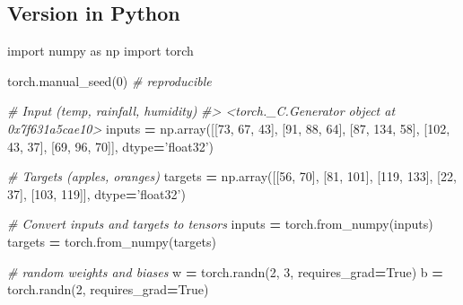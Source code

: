 \documentclass[]{book}
\newenvironment{Shaded}{\begin{snugshade}}{\end{snugshade}}
\newcommand{\CommentTok}[1]{\textcolor[rgb]{0.56,0.35,0.01}{\textit{#1}}}
\newcommand{\DecValTok}[1]{\textcolor[rgb]{0.00,0.00,0.81}{#1}}
\newcommand{\ImportTok}[1]{#1}
\newcommand{\NormalTok}[1]{#1}
\newcommand{\OperatorTok}[1]{\textcolor[rgb]{0.81,0.36,0.00}{\textbf{#1}}}
\newcommand{\StringTok}[1]{\textcolor[rgb]{0.31,0.60,0.02}{#1}}
\newcommand{\VariableTok}[1]{\textcolor[rgb]{0.00,0.00,0.00}{#1}}
\begin{document}
\hypertarget{version-in-python}{%
\subsection{Version in Python}\label{version-in-python}}

\begin{Shaded}
\begin{Highlighting}[]
\ImportTok{import}\NormalTok{ numpy }\ImportTok{as}\NormalTok{ np}
\ImportTok{import}\NormalTok{ torch}

\NormalTok{torch.manual_seed(}\DecValTok{0}\NormalTok{)  }\CommentTok{# reproducible}

\CommentTok{# Input (temp, rainfall, humidity)}
\CommentTok{#> <torch._C.Generator object at 0x7f631a5cae10>}
\NormalTok{inputs }\OperatorTok{=}\NormalTok{ np.array([[}\DecValTok{73}\NormalTok{, }\DecValTok{67}\NormalTok{, }\DecValTok{43}\NormalTok{],}
\NormalTok{                   [}\DecValTok{91}\NormalTok{, }\DecValTok{88}\NormalTok{, }\DecValTok{64}\NormalTok{],}
\NormalTok{                   [}\DecValTok{87}\NormalTok{, }\DecValTok{134}\NormalTok{, }\DecValTok{58}\NormalTok{],}
\NormalTok{                   [}\DecValTok{102}\NormalTok{, }\DecValTok{43}\NormalTok{, }\DecValTok{37}\NormalTok{],}
\NormalTok{                   [}\DecValTok{69}\NormalTok{, }\DecValTok{96}\NormalTok{, }\DecValTok{70}\NormalTok{]], dtype}\OperatorTok{=}\StringTok{'float32'}\NormalTok{)}

\CommentTok{# Targets (apples, oranges)}
\NormalTok{targets }\OperatorTok{=}\NormalTok{ np.array([[}\DecValTok{56}\NormalTok{, }\DecValTok{70}\NormalTok{],}
\NormalTok{                    [}\DecValTok{81}\NormalTok{, }\DecValTok{101}\NormalTok{],}
\NormalTok{                    [}\DecValTok{119}\NormalTok{, }\DecValTok{133}\NormalTok{],}
\NormalTok{                    [}\DecValTok{22}\NormalTok{, }\DecValTok{37}\NormalTok{],}
\NormalTok{                    [}\DecValTok{103}\NormalTok{, }\DecValTok{119}\NormalTok{]], dtype}\OperatorTok{=}\StringTok{'float32'}\NormalTok{)}
                    

\CommentTok{# Convert inputs and targets to tensors}
\NormalTok{inputs }\OperatorTok{=}\NormalTok{ torch.from_numpy(inputs)}
\NormalTok{targets }\OperatorTok{=}\NormalTok{ torch.from_numpy(targets)}

\CommentTok{# random weights and biases}
\NormalTok{w }\OperatorTok{=}\NormalTok{ torch.randn(}\DecValTok{2}\NormalTok{, }\DecValTok{3}\NormalTok{, requires_grad}\OperatorTok{=}\VariableTok{True}\NormalTok{)}
\NormalTok{b }\OperatorTok{=}\NormalTok{ torch.randn(}\DecValTok{2}\NormalTok{, requires_grad}\OperatorTok{=}\VariableTok{True}\NormalTok{)}


\end{Highlighting}
\end{Shaded}
\end{document}
